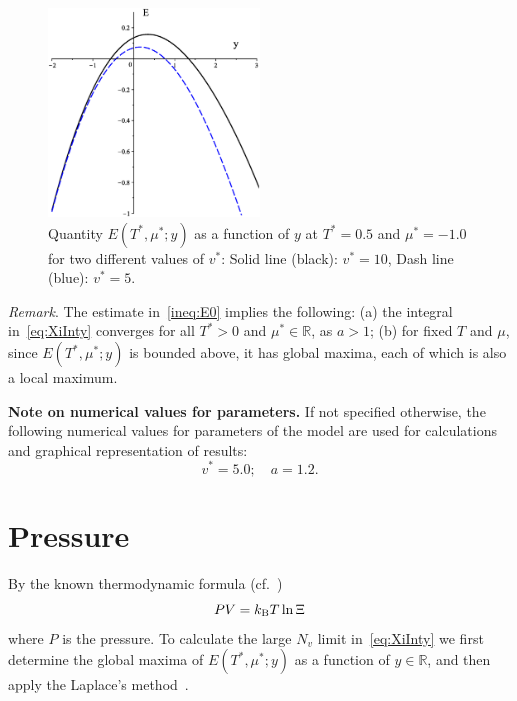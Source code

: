 \documentclass[12pt]{article}
\numberwithin{equation}{section}
\begin{document}
	\begin{figure}[htbp]
		\includegraphics[width=0.5\textwidth,angle=0]{images/E0_vs_y2}
		\centering
		\captionsetup{width=0.6\textwidth}
		\caption{Quantity $E(T^*,\mu^*;y)$ as a function of $y$ at $T^*=0.5$ and $\mu^*=-1.0$ for two different values of $v^*$: Solid line (black): $v^* = 10$, Dash line (blue): $v^* = 5$.}
		\label{fig:E0_vs_y}
	\end{figure}
	
	\textit{Remark}. The estimate in~\eqref{ineq:E0} implies the following: (a) the integral in~\eqref{eq:XiInty} converges for all $T^*>0$ and $\mu^* \in \mathbb{R}$, as $a>1$; (b) for fixed $T$ and $\mu$, since $E(T^*,\mu^*;y)$ is bounded above, it has global maxima, each of which is also a local maximum.
	
	\textbf{Note on numerical values for parameters.} If not specified otherwise, the following numerical values for parameters of the model are used for calculations and graphical representation of results:
	\begin{equation}
		v^* = 5.0; \quad a = 1.2.
	\end{equation}
	
	
	\section{Pressure}
	By the known thermodynamic formula (cf.~\cite[(2.16)]{KKD20})
	\begin{equation}
		\label{def:eos}
		P V = k_{\rm B} T \ln \Xi
	\end{equation}
	where $P$ is the pressure. To calculate the large $N_v$ limit in~\eqref{eq:XiInty} we first determine the global maxima of $E(T^*,\mu^*;y)$ as a function of $y \in \mathbb{R}$, and then apply the Laplace's method~\cite{Fedoryuk89}.
	
\end{document}
